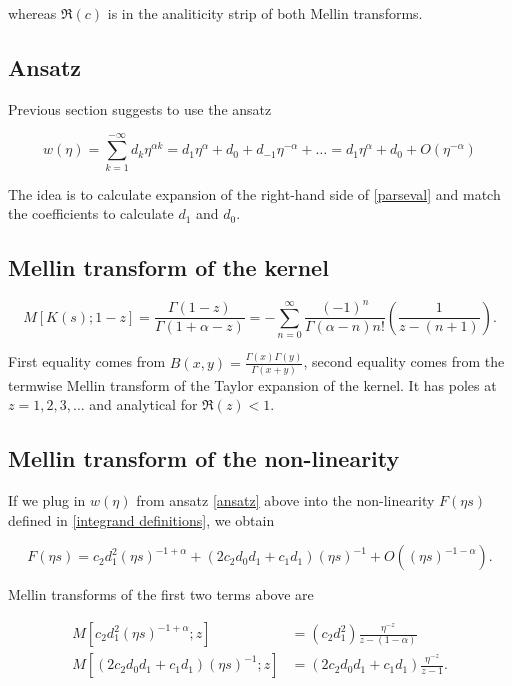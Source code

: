 \documentclass[12pt]{article}
\theoremstyle{plain}
\begin{document}
whereas $\Re (c)$ is in the analiticity strip of both Mellin transforms.

\subsection{Ansatz}

Previous section suggests to use the ansatz

\begin{equation} \label{ansatz}
w(\eta) = \sum_{k=1}^{-\infty} d_k \eta^{\alpha k} = d_1 \eta^\alpha + d_0 + d_{-1} \eta ^ {-\alpha} + \dots = d_1 \eta^\alpha + d_0 + O(\eta^{-\alpha})
\end{equation}

The idea is to calculate expansion of the right-hand side of \eqref{parseval} and match the coefficients to calculate $d_1$ and $d_0$.

\subsection{Mellin transform of the kernel}

$$
M[K(s); 1-z] = \frac{\Gamma(1-z)}{\Gamma(1+\alpha-z)} = - \sum _{n=0} ^\infty \frac{(-1)^n}{\Gamma(\alpha-n) n!} \left(\frac{1}{z-(n+1)}\right).
$$

First equality comes from $B(x,y)=\frac{\Gamma(x)\Gamma(y)}{\Gamma(x+y)}$, second equality comes from the termwise Mellin transform of the Taylor expansion of the kernel. It has poles at $z = 1, 2, 3, \dots$ and analytical for $\Re (z) < 1$.

\subsection{Mellin transform of the non-linearity}

If we plug in $w(\eta)$ from ansatz \eqref{ansatz} above into the non-linearity $F(\eta s)$ defined in \eqref{integrand definitions}, we obtain

$$
F(\eta s) = c_2 d_1^2  (\eta s)^{-1+\alpha} + (2 c_2 d_0d_1 + c_1 d_1)(\eta s)^{-1} + O((\eta s)^{-1-\alpha} ).
$$

Mellin transforms of the first two terms above are

\begin{equation} \label{mellin transforms of non-linearity}
\begin{aligned}
M\left[c_2 d_{1}^{2} (\eta s)^{-1+\alpha}; z\right] &= (c_2 d_{1}^{2}) \frac{\eta ^{-z}}{z-(1-\alpha)}\\
M\left[(2 c_2 d_0d_1 + c_1 d_1) (\eta s)^{-1}; z\right] &= (2 c_2 d_0d_1 + c_1 d_1) \frac{\eta ^{-z}}{z-1}.
\end{aligned}
\end{equation}
\end{document}
